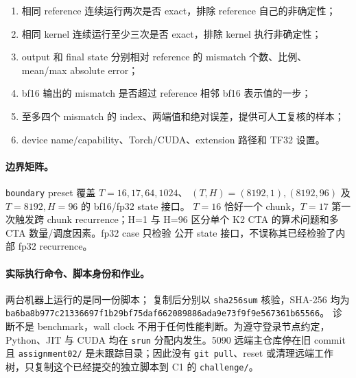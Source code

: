 \documentclass[11pt,a4paper,fontset=none]{ctexart}
\newcommand{\code}[1]{\texttt{#1}}
\begin{document}
\begin{enumerate}
  \item 相同 reference 连续运行两次是否 exact，排除 reference 自己的非确定性；
  \item 相同 kernel 连续运行至少三次是否 exact，排除 kernel 执行非确定性；
  \item output 和 final state 分别相对 reference 的 mismatch 个数、比例、
        mean/max absolute error；
  \item bf16 输出的 mismatch 是否超过 reference 相邻 bf16 表示值的一步；
  \item 至多四个 mismatch 的 index、两端值和绝对误差，提供可人工复核的样本；
  \item device name/capability、Torch/CUDA、extension 路径和 TF32 设置。
\end{enumerate}

\paragraph{边界矩阵。} \code{boundary} preset 覆盖 \(T=16,17,64,1024\)、
\((T,H)=(8192,1),(8192,96)\) 及 \(T=8192,H=96\) 的 bf16/fp32 state 接口。
\(T=16\) 恰好一个 chunk，\(T=17\) 第一次触发跨 chunk recurrence；H=1 与
H=96 区分单个 K2 CTA 的算术问题和多 CTA 数量/调度因素。fp32 case 只检验
公开 state 接口，不误称其已经检验了内部 fp32 recurrence。

\paragraph{实际执行命令、脚本身份和作业。} 两台机器上运行的是同一份脚本；
复制后分别以 \code{sha256sum} 核验，SHA-256 均为
\code{ba6ba8b977c21336697f1b29bf75daf662089886ada9e73f9f9e567361b65566}。
诊断不是 benchmark，wall clock 不用于任何性能判断。为遵守登录节点约定，
Python、JIT 与 CUDA 均在 \code{srun} 分配内发生。5090 远端主仓库停在旧
commit 且 \code{assignment02/} 是未跟踪目录；因此没有 \code{git pull}、reset
或清理远端工作树，只复制这个已经提交的独立脚本到 C1 的 \code{challenge/}。
\end{document}
